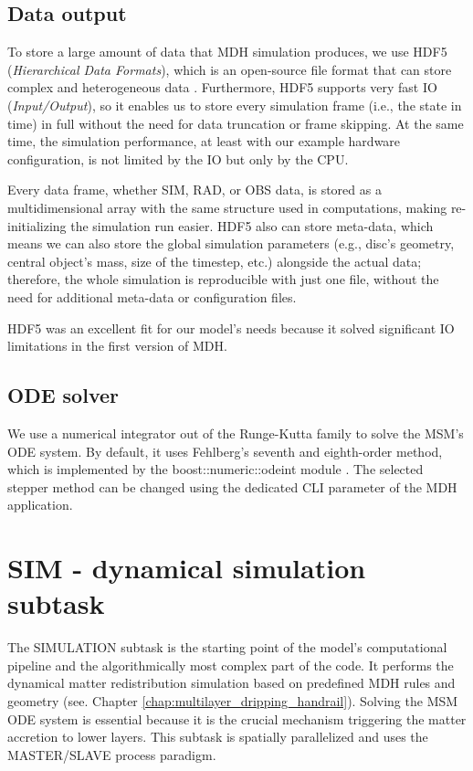 \subsection{Data output}
    To store a large amount of data that MDH simulation produces, we use HDF5 (\emph{Hierarchical Data Formats}), which is an open-source file format that can store complex and heterogeneous data \citep{hdf5_2006}. Furthermore, HDF5 supports very fast IO (\emph{Input/Output}), so it enables us to store every simulation frame (i.e., the state in time) in full without the need for data truncation or frame skipping. At the same time, the simulation performance, at least with our example hardware configuration, is not limited by the IO but only by the CPU. 

    Every data frame, whether SIM, RAD, or OBS data, is stored as a multidimensional array with the same structure used in computations, making re-initializing the simulation run easier. HDF5 also can store meta-data, which means we can also store the global simulation parameters (e.g., disc's geometry, central object's mass, size of the timestep, etc.) alongside the actual data; therefore, the whole simulation is reproducible with just one file, without the need for additional meta-data or configuration files.

    HDF5 was an excellent fit for our model's needs because it solved significant IO limitations in the first version of MDH.

\subsection{ODE solver}
    We use a numerical integrator out of the Runge-Kutta family to solve the MSM's ODE system. By default, it uses Fehlberg's seventh and eighth-order method, which is implemented by the boost::numeric::odeint module \citep{boost_2007}. The selected stepper method can be changed using the dedicated CLI parameter of the MDH application. 

\section{SIM - dynamical simulation subtask}
    The SIMULATION subtask is the starting point of the model's computational pipeline and the algorithmically most complex part of the code. It performs the dynamical matter redistribution simulation based on predefined MDH rules and geometry (see. Chapter \ref{chap:multilayer_dripping_handrail}). Solving the MSM ODE system is essential because it is the crucial mechanism triggering the matter accretion to lower layers. This subtask is spatially parallelized and uses the \mbox{MASTER/SLAVE} process paradigm.

